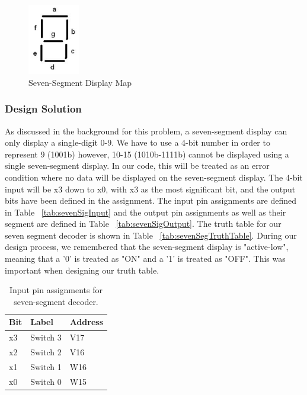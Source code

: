 \documentclass[11pt]{article}
\begin{document}
\begin{figure}[h]
\begin{center}
\includegraphics[width=0.2\textwidth]{report-images/img1.png}
\caption{Seven-Segment Display Map}
\label{fig:sevenSegMap}
\end{center}
\end{figure}

\subsubsection{Design Solution}
As discussed in the background for this problem, a seven-segment display can only display a single-digit 0-9. We have to use a 4-bit number in order to represent 9 (1001b) however, 10-15 (1010b-1111b) cannot be displayed using a single seven-segment display. In our code, this will be treated as an error condition where no data will be displayed on the seven-segment display. The 4-bit input will be x3 down to x0, with x3 as the most significant bit, and the output bits have been defined in the assignment. The input pin assignments are defined in Table ~\ref{tab:sevenSigInput} and the output pin assignments as well as their segment are defined in Table ~\ref{tab:sevenSigOutput}. The truth table for our seven segment decoder is shown in Table ~\ref{tab:sevenSegTruthTable}. During our design process, we remembered that the seven-segment display is "active-low", meaning that a '0' is treated as "ON" and a '1' is treated as "OFF". This was important when designing our truth table.

\begin{table}[h]
\begin{center}
	\begin{tabular}{| l | l | l |}
		\hline
		Bit & Label & Address \\ \hline
		x3 & Switch 3 & V17 \\ \hline
		x2 & Switch 2 & V16 \\ \hline
		x1 & Switch 1 & W16 \\ \hline
		x0 & Switch 0 & W15 \\ \hline
	\end{tabular}
	\caption{\label{tab:table-name}Input pin assignments for seven-segment decoder.}
	\label{tab:sevenSegInput}
\end{center}
\end{table}
\end{document}
